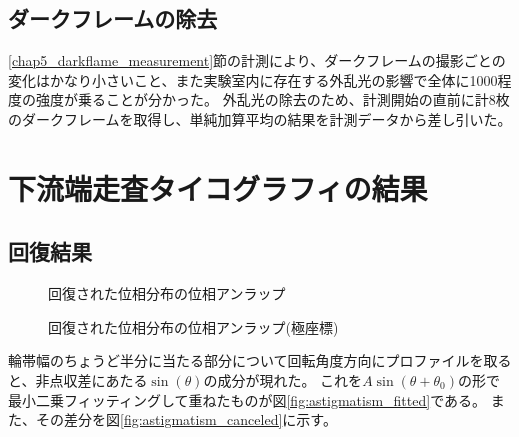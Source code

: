 \subsection{ダークフレームの除去}
\ref{chap5_darkflame_measurement}節の計測により、ダークフレームの撮影ごとの変化はかなり小さいこと、また実験室内に存在する外乱光の影響で全体に1000程度の強度が乗ることが分かった。
外乱光の除去のため、計測開始の直前に計8枚のダークフレームを取得し、単純加算平均の結果を計測データから差し引いた。

\clearpage

\newpage

\section{下流端走査タイコグラフィの結果}
\label{chap5_mirror_transverse_result}

\subsection{回復結果}

\begin{figure}[!ht]
\centering
{}
\caption[]{回復された位相分布の位相アンラップ}
\label{fig:reconstructed_phase_unwrapping}
\end{figure}


\begin{figure}[!ht]
\centering
{}
\caption[]{回復された位相分布の位相アンラップ(極座標)}
\label{fig:reconstructed_phase_unwrapping_polar}
\end{figure}

輪帯幅のちょうど半分に当たる部分について回転角度方向にプロファイルを取ると、非点収差にあたる$\sin(\theta)$の成分が現れた。
これを$A \sin(\theta + \theta_0)$の形で最小二乗フィッティングして重ねたものが図\ref{fig:astigmatism_fitted}である。
また、その差分を図\ref{fig:astigmatism_canceled}に示す。

